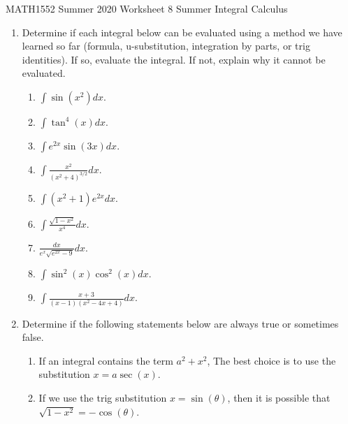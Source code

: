 \documentclass[12pt]{article}
\begin{document}
\noindent
MATH1552 Summer 2020
\hspace{2.2cm}
Worksheet 8 Summer
\hspace{2cm} Integral Calculus

\vspace{2mm}


\begin{enumerate}

\item Determine if each integral below can be evaluated using a method we have learned so
far (formula, u-substitution, integration by parts, or trig identities). If so, evaluate the
integral. If not, explain why it cannot be evaluated.



\begin{enumerate}
\item $\int \sin(x^2)dx$.

\item $\int \tan^4(x)dx$.

\item $\int e^{2x}\sin(3x)dx$.

\item $\int \frac{x^2}{(x^2+4)^{3/2}}dx$.

\item $\int (x^2+1)e^{2x}dx$.

\item $\int \frac{\sqrt{1-x^2}}{x^4}dx$.

\item $\frac{dx}{e^x \sqrt{e^{2x}-9}}dx$.

\item $\int \sin^2(x)\cos^2(x)dx$.

\item $\int \frac{x+3}{(x-1)(x^2-4x+4)}dx$.

\end{enumerate}


\item Determine if the following statements below are always true or sometimes false.

\begin{enumerate}
\item If an integral contains the term $a^2 + x^2$, The best choice is to use the substitution $x = a \sec(x)$. 

\item If we use the trig substitution $x = \sin(\theta)$, then it is possible that $\sqrt{1-x^2}=-\cos(\theta)$.


\end{enumerate}

\end{enumerate}
\end{document}
